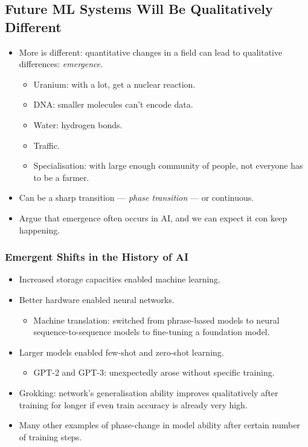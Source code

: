 \subsection{Future ML Systems Will Be Qualitatively Different}

\begin{itemize}
    \item More is different: quantitative changes in a field can lead to qualitative differences: \emph{emergence}.
    \begin{itemize}
        \item Uranium: with a lot, get a nuclear reaction.
        \item DNA: smaller molecules can't encode data.
        \item Water: hydrogen bonds.
        \item Traffic.
        \item Specialisation: with large enough community of people, not everyone has to be a farmer.
    \end{itemize}
    \item Can be a sharp transition — \emph{phase transition} — or continuous.
    \item Argue that emergence often occurs in AI, and we can expect it con keep happening.
\end{itemize}


\subsubsection{Emergent Shifts in the History of AI}

\begin{itemize}
    \item Increased storage capacities enabled machine learning.
    \item Better hardware enabled neural networks.
    \begin{itemize}
        \item Machine translation: switched from phrase-based models to neural sequence-to-sequence models to fine-tuning a foundation model.
    \end{itemize}
    \item Larger models enabled few-shot and zero-shot learning.
    \begin{itemize}
        \item GPT-2 and GPT-3: unexpectedly arose without specific training.
    \end{itemize}
    \item Grokking: network's generalisation ability improves qualitatively after training for longer if even train accuracy is already very high.
    \item Many other examples of phase-change in model ability after certain number of training steps.
\end{itemize}


